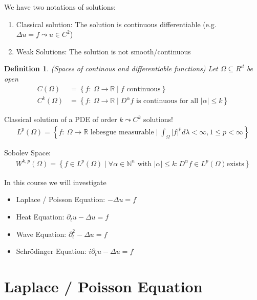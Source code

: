 \documentclass{report}
\theoremstyle{tommy}
\newtheorem{defn}{Definition}
\begin{document}
  We have two notations of solutions:
  \begin{enumerate}
    \item Classical solution: The solution is continuous differentiable (e.g. \( \Delta u = f  \leadsto u \in C^2  \))
    \item Weak Solutions: The solution is not smooth/continuous
  \end{enumerate}

  \begin{defn} (Spaces of continous and differentiable functions)
    Let \(\Omega \subseteq R^d\) be open
    \begin{align*}
      C(\Omega) &= \left\{ f: \ \Omega \to \mathbb{R} \mid f \text{ continuous} \right\} \\
      C^k(\Omega) &= \left\{ f: \ \Omega \to \mathbb{R} \mid D^\alpha f \text{ is continuous for all } |\alpha| \le k \right\}
    \end{align*}
  \end{defn}

  Classical solution of a PDE of order \(k \leadsto C^k\) solutions!
  \begin{align*}
    L^p(\Omega) = \left\{ f: \ \Omega \to \mathbb{R} \text{ lebesgue measurable} \mid \int_\Omega |f|^p d\lambda < \infty, 1 \le p < \infty \right\}
  \end{align*}

  Sobolev Space:
  \begin{align*}
    W^{k,p}(\Omega)= \left \{ f \in L^p(\Omega) \mid \forall \alpha \in \mathbb{N}^n \text{ with } |\alpha| \leq k: D^{\alpha}f \in L^p(\Omega) \text{exists}  \right \}
  \end{align*}

  In this course we will investigate
  \begin{itemize}
    \item Laplace / Poisson Equation: \(-\Delta u = f\)
    \item Heat Equation: \(\partial_t u - \Delta u = f\)
    \item Wave Equation: \(\partial_t^2 - \Delta u = f\)
    \item Schrödinger Equation: \(i \partial_t u - \Delta u = f\)
  \end{itemize}


  \chapter{Laplace / Poisson Equation}
\end{document}
